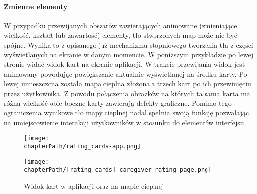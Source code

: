 \paragraph{Zmienne elementy}
W przypadku przewijanych obszarów zawierających animowane (zmieniające wielkość, kształt lub zawartość) elementy, tło stworzonych map może nie być spójne. Wynika to z opisanego już mechanizmu stopniowego tworzenia tła z części wyświetlanych na ekranie w danym momencie. W poniższym przykładzie po lewej stronie widać widok kart na ekranie aplikacji. W trakcie przewijania widok jest animowany powodując powiększenie aktualnie wyświetlanej na środku karty. Po lewej umieszczona została mapa cieplna złożona z trzech kart po ich przewinięciu przez użytkownika. Z powodu połączenia obrazków na których ta sama karta ma różną wielkość obie boczne karty zawierają defekty graficzne. Pomimo tego ograniczenia wynikowe tło mapy cieplnej nadal spełnia swoją funkcję pozwalając na umiejscowienie interakcji użytkowników w stosunku do elementów interfejsu.

\bigskip
\begin{figure}[H]
\begin{minipage}{.25\textwidth}
	\centering
	\texttt{[image: \\chapterPath/rating\_cards-app.png]}
\end{minipage}
\begin{minipage}{.74\textwidth}
	\centering
	\texttt{[image: \\chapterPath/[rating-cards]-caregiver-rating-page.png]}
\end{minipage}
\bigskip
\caption{Widok kart w aplikacji oraz na mapie cieplnej}
\label{fig:rs_rating_cards}
\end{figure}
